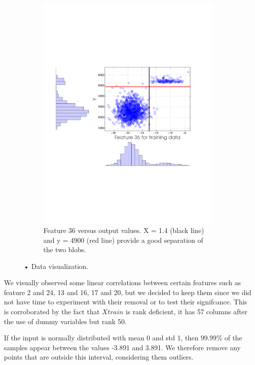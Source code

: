 \documentclass{article} %
\begin{document}
\begin{figure}[ht]
\begin{subfigure}[b]{0.45\textwidth}
    \includegraphics[width=\textwidth]{figures/feature36_13_crop.pdf}
    \caption{Feature 36 versus output values. X = 1.4 (black line) and y = 4900 (red line)  provide a good separation of the two blobs.}
    \label{fig:feature36}
  \end{subfigure}
  \caption{• Data visualization. }
\end{figure}

We visually observed some linear correlations between certain features such as feature 2 and 24, 13 and 16, 17 and 20, but we decided to keep them since we did not have time to experiment with their removal or to test their signifcance. This is corroborated by the fact that $Xtrain$ is rank deficient, it has 57 columns after the use of dummy variables but rank 50.

If the input is normally distributed with mean 0 and std 1, then
 $99.99\%$ of the samples appear between the values -3.891 and 3.891. We therefore remove any points that are outside this interval, considering them outliers.
\end{document}
